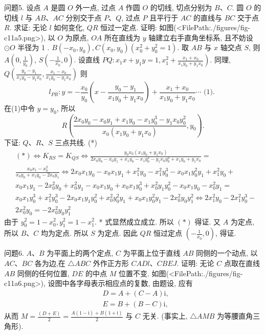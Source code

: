 问题5. 设点 $A$ 是圆 $O$ 外一点, 过点 $A$ 作圆 $O$ 的切线, 切点分别为 $B 、 C$. 圆 $O$ 的切线 $l$ 与 $A B 、 A C$ 分别交于点 $P 、 Q$, 过点 $P$ 且平行于 $A C$ 的直线与 $B C$ 交于点 $R$. 求证: 无论 $l$ 如何变化, $Q R$ 恒过一定点.
证明: 如图(<FilePath:./figures/fig-c11a5.png>), 以 $O$ 为原点, $O A$ 所在直线为 $y$ 轴建立右手直角坐标系, 且不妨设 $\odot O$ 半径为 1 . $B\left(-x_0, y_0\right), C\left(x_0, y_0\right)\left(x_0^2+y_0^2=1\right)$.
取 $A B$ 与 $x$ 轴交点 $S$, 则 $A\left(0, \frac{1}{y_0}\right)$, $S\left(-\frac{1}{x_0}, 0\right)$. 设直线 $P Q: x_1 x+y_1 y=1, x_1^2+\left.\frac{x_1+x_0}{x_1 y_0+y_1 x_0}\right)$. 同理, $Q\left(\frac{y_0-y_1}{x_1 y_0-y_1 x_0}, \frac{x_1-x_0}{x_1 y_0-y_1 x_0}\right)$ 则
$$
l_{P R}: y=-\frac{x_0}{y_0}\left(x-\frac{y_0-y_1}{x_1 y_0+y_1 x_0}\right)+\frac{x_1+x_0}{x_1 y_0+y_1 x_0} \cdots \text { (1). }
$$
在(1)中令 $y=y_0$, 所以
$$
R\left(\frac{2 x_0 y_0-x_0 y_1+x_1 y_0-x_1 y_0^3-y_1 x_0 y_0^2}{x_0\left(x_1 y_0+y_1 x_0\right)}, y_0\right) .
$$
下证: $Q 、 R 、 S$ 三点共线.
(*)
$$
\begin{aligned}
& (*) \Leftrightarrow K_{R S}=K_{Q S} \Leftrightarrow \frac{y_0 x_0\left(x_1 y_0+y_1 x_0\right)}{2 x_0 y_0-x_0 y_1+x_1 y_0-x_1 y_0^3-y_1 x_0 y_0^2+x_1 y_0+y_1 x_0}= \\
& \frac{x_0 x_1-x_0^2}{x_0 y_0+x_1 y_0-2 x_0 y_1} \Leftrightarrow 2 x_0 x_1 y_0-x_0 x_1 y_1+x_1^2 y_0-x_1^2 y_0^3-x_0 x_1 y_0^2 y_1+x_1^2 y_0+ \\
& x_0 x_1 y_1-2 x_0^2 y_0+x_0^2 y_1-x_0 x_1 y_0+x_0 x_1 y_0^3+x_0^2 y_1 y_0^2-x_0 x_1 y_0-x_0^2 y_1= \\
& x_0 x_1 y_0^3+x_1^2 y_0^3-2 x_0 x_1 y_1 y_0^2+x_0^2 y_0^2 y_1+x_0 x_1 y_0^2 y_1-2 x_0^2 y_0 y_1^2 \Leftrightarrow 2 x_1^2 y_0-2 x_1^2 y_0^3- \\
& 2 x_0^2 y_0=-2 x_0^2 y_0 y_1^2
\end{aligned}
$$
由于 $y_0^2=1-x_0^2, y_1^2=1-x_1^2$. * 式显然成立成立.
所以 $(*)$ 得证.
又 $A$ 为定点, 所以 $B 、 C$ 均为定点.
所以 $S$ 为定点.
因此 $Q R$ 恒过定点 $\left(-\frac{1}{x_0}, 0\right)$, 得证.



问题6. $A 、 B$ 为平面上的两个定点, $C$ 为平面上位于直线 $A B$ 同侧的一个动点, 以 $A C 、 B C$ 各为边,在 $\triangle A B C$ 外作正方形 $C A D l 、 C B E J$. 证明: 无论 $C$ 点取在直线 $A B$ 同侧的任何位置, $D E$ 的中点 $M$ 位置不变.
如图(<FilePath:./figures/fig-c11a6.png>), 设图中各字母表示相应点的复数, 由题设, 应有
$$
\begin{aligned}
& D=A+(C-A) \mathrm{i}, \\
& E=B+(B-C) \mathrm{i},
\end{aligned}
$$
从而 $M=\frac{(D+E)}{2}=\frac{A(1-\mathrm{i})+B(1+\mathrm{i})}{2}$ 与 $C$ 无关.
(事实上, $\triangle A M B$ 为等腰直角三角形).



